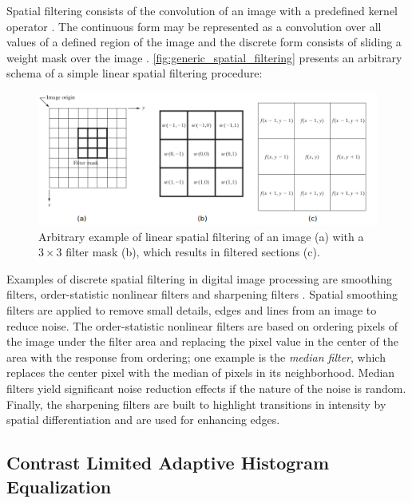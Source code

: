 Spatial filtering consists of the convolution of an image with a predefined kernel operator \cite{gonzalez2018digital}. The continuous form may be represented as a convolution over all values of a defined region of the image and the discrete form consists of sliding a weight mask over the image \cite{wu2008microscope}. \autoref{fig:generic_spatial_filtering} presents an arbitrary schema of a simple linear spatial filtering procedure:

\begin{figure}[htb]
	\centering
	\caption{\label{fig:generic_spatial_filtering} Arbitrary example of linear spatial filtering of an image (a) with a $3 \times 3$ filter mask (b), which results in filtered sections (c).} 
	\begin{center}
	    \includegraphics[scale=0.4]{images/generic_spatial_filtering.png}
	\end{center}
	\centering
\end{figure}

Examples of discrete spatial filtering in digital image processing are smoothing filters, order-statistic nonlinear filters and sharpening filters \cite{gonzalez2018digital}. Spatial smoothing filters are applied to remove small details, edges and lines from an image to reduce noise. The order-statistic nonlinear filters are based on ordering pixels of the image under the filter area and replacing the pixel value in the center of the area with the response from ordering; one example is the \emph{median filter}, which replaces the center pixel with the median of pixels in its neighborhood. Median filters yield significant noise reduction effects if the nature of the noise is random. Finally, the sharpening filters are built to highlight transitions in intensity by spatial differentiation and are used for enhancing edges.

\subsection{Contrast Limited Adaptive Histogram Equalization}

